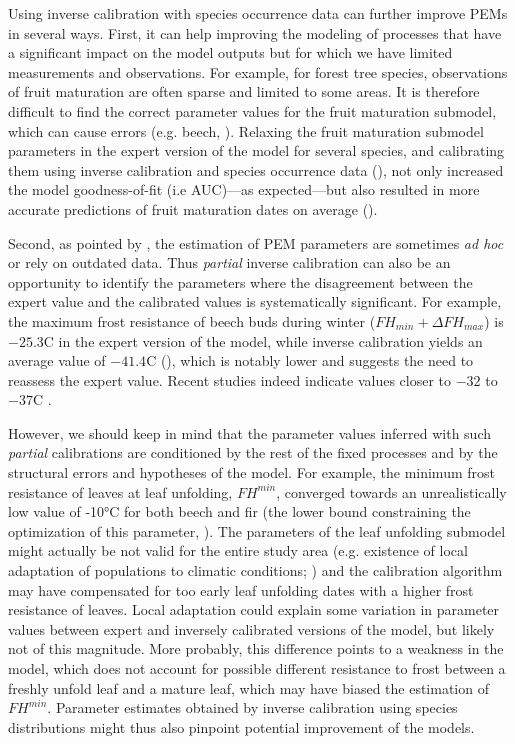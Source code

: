 \documentclass[preprint,12pt,authoryear]{elsarticle}
\begin{document}
{Using inverse calibration with species occurrence data can further improve PEMs in several ways. First, it can help improving the modeling of processes that have a significant impact on the model outputs but for which we have limited measurements and observations. For example, for forest tree species, observations of fruit maturation are often sparse and limited to some areas. It is therefore difficult to find the correct parameter values for the fruit maturation submodel, which can cause errors (e.g. beech, ). Relaxing the fruit maturation submodel parameters in the expert version of the model for several species, and calibrating them using inverse calibration and species occurrence data (), not only increased the model goodness-of-fit (i.e AUC)---as expected---but also resulted in more accurate predictions of fruit maturation dates on average ().

Second, as pointed by \cite{Harrison2021}, the estimation of PEM parameters are sometimes \emph{ad hoc} or rely on outdated data. Thus \emph{partial} inverse calibration can also be an opportunity to identify the parameters where the disagreement between the expert value and the calibrated values is systematically significant. For example, the maximum frost resistance of beech buds during winter ($FH_{min}+\Delta FH_{max}$) is $-25.3$\degree C in the expert version of the model, while inverse calibration yields an average value of $-41.4$\degree C (), which is notably lower and suggests the need to reassess the expert value. Recent studies indeed indicate values closer to $-32$ to $-37$\degree C \citep{Delaporte2015, Kreyling2014, Lenz2016, Baffoin2021, CharraVaskou2012}.
 
However, we should keep in mind that the parameter values inferred with such \emph{partial} calibrations are conditioned by the rest of the fixed processes and by the structural errors and hypotheses of the model. For example, the minimum frost resistance of leaves at leaf unfolding, ${FH}^{min}$, converged towards an unrealistically low value of -10°C for both beech and fir (the lower bound constraining the optimization of this parameter, ). The parameters of the leaf unfolding submodel might actually be not valid for the entire study area (e.g. existence of local adaptation of populations to climatic conditions; \citealp{Kreyling2014, Lazic2024}) and the calibration algorithm may have compensated for too early leaf unfolding dates with a higher frost resistance of leaves. Local adaptation could explain some variation in parameter values between expert and inversely calibrated versions of the model, but likely not of this magnitude. More probably, this difference points to a weakness in the model, which does not account for possible different resistance to frost between a freshly unfold leaf and a mature leaf, which may have biased the estimation of ${FH}^{min}$. Parameter estimates obtained by inverse calibration using species distributions might thus also pinpoint potential improvement of the models.

}
\end{document}
